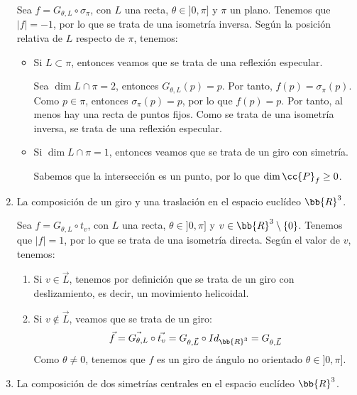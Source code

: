 \begin{ejercicio}
\begin{enumerate}
        Sea $f = G_{\theta, L} \circ \sigma_{\pi}$, con $L$ una recta, $\theta \in ]0, \pi]$ y $\pi$ un plano.
        Tenemos que $|f| = -1$, por lo que se trata de una isometría inversa. Según la posición relativa de $L$ respecto de $\pi$, tenemos:
        \begin{itemize}
            \item Si $L\subset \pi$, entonces veamos que se trata de una reflexión especular.
            
            Sea $\dim L\cap \pi=2$, entonces $G_{\theta, L}(p)=p$. Por tanto, $f(p)=\sigma_{\pi}(p)$. Como $p\in \pi$, entonces $\sigma_{\pi}(p)=p$, por lo que $f(p)=p$.
            Por tanto, al menos hay una recta de puntos fijos. Como se trata de una isometría inversa, se trata de una reflexión especular.
            
            \item Si $\dim L\cap \pi=1$, entonces veamos que se trata de un giro con simetría.
            
            Sabemos que la intersección es un punto, por lo que $\dim \cc{P}_f \geq 0$.
        \end{itemize}

        \item La composición de un giro y una traslación en el espacio euclídeo $\bb{R}^3$.
        
        Sea $f = G_{\theta, L} \circ t_v$, con $L$ una recta, $\theta \in ]0, \pi]$ y $v\in \bb{R}^3\setminus \{0\}$.
        Tenemos que $|f| = 1$, por lo que se trata de una isometría directa. Según el valor de $v$, tenemos:
        \begin{enumerate}
            \item Si $v\in \vec{L}$, tenemos por definición que se trata de un giro con deslizamiento, es decir, un movimiento helicoidal.
            \item Si $v\notin \vec{L}$, veamos que se trata de un giro:
            \begin{equation*}
                \vec{f} = \vec{G_{\theta, L}} \circ \vec{t_v} = G_{\theta, \vec{L}} \circ Id_{\bb{R}^3} = G_{\theta, \vec{L}}
            \end{equation*}
            Como $\theta \neq 0$, tenemos que $f$ es un giro de ángulo no orientado $\theta \in ]0, \pi]$.
        \end{enumerate}


        \item La composición de dos simetrías centrales en el espacio euclídeo $\bb{R}^3$.
        

\end{enumerate}
\end{ejercicio}
